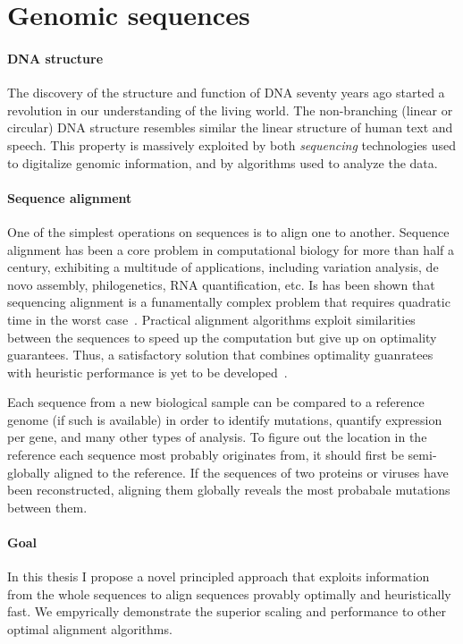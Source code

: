 \section*{Genomic sequences}

\paragraph{DNA structure} The discovery of the structure and function of
DNA\citep{watson1953structure} seventy years ago started a revolution in our
understanding of the living world. The non-branching (linear or circular) DNA
structure resembles similar the linear structure of human text and speech. This
property is massively exploited by both \emph{sequencing} technologies used to
digitalize genomic information, and by algorithms used to analyze the data.

\paragraph{Sequence alignment} One of the simplest operations on sequences is to
align one to another. Sequence alignment has been a core problem in
computational biology for more than half a century, exhibiting a multitude of
applications, including variation analysis, de novo assembly, philogenetics, RNA
quantification, etc. Is has been shown that sequencing alignment is a
funamentally complex problem that requires quadratic time in the worst
case~\citep{backurs2015edit}. Practical alignment algorithms exploit
similarities between the sequences to speed up the computation but give up on
optimality guarantees. Thus, a satisfactory solution that combines optimality
guanratees with heuristic performance is yet to be
developed~\citep{medvedev2022theoretical}.

Each sequence from a new biological sample can be compared to a reference genome
(if such is available) in order to identify mutations, quantify expression per
gene, and many other types of analysis. To figure out the location in the
reference each sequence most probably originates from, it should first be
semi-globally aligned to the reference. If the sequences of two proteins or
viruses have been reconstructed, aligning them globally reveals the most
probabale mutations between them.

\paragraph{Goal} In this thesis I propose a novel principled approach that
exploits information from the whole sequences to align sequences provably
optimally and heuristically fast. We empyrically demonstrate the superior
scaling and performance to other optimal alignment algorithms.

